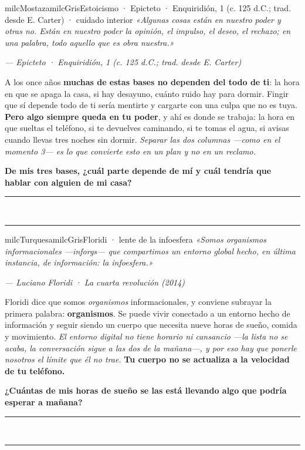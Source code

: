 \documentclass[11pt,letterpaper]{article}
\newcommand{\linead}[1]{\noindent\color{milcLinea}\rule{#1}{0.5pt}\color{milcNegro}}
\begin{document}
\begin{softbox}{milcMostaza}{milcGris}{Estoicismo · Epicteto · Enquiridión, 1 (c. 125 d.C.; trad. desde E. Carter) · cuidado interior}
\textit{«Algunas cosas están en nuestro poder y otras no. Están en nuestro poder la opinión, el impulso, el deseo, el rechazo; en una palabra, todo aquello que es obra nuestra.»}

{\footnotesize\itshape\color{milcNegro!70}--- Epicteto · Enquiridión, 1 (c. 125 d.C.; trad. desde E. Carter)}

A los once años \textbf{muchas de estas bases no dependen del todo de ti}: la hora en que se apaga la casa, si hay desayuno, cuánto ruido hay para dormir. Fingir que sí depende todo de ti sería mentirte y cargarte con una culpa que no es tuya. \textbf{Pero algo siempre queda en tu poder}, y ahí es donde se trabaja: la hora en que sueltas el teléfono, si te devuelves caminando, si te tomas el agua, si avisas cuando llevas tres noches sin dormir. \emph{Separar las dos columnas ---como en el momento 3--- es lo que convierte esto en un plan y no en un reclamo.}

\textbf{De mis tres bases, ¿cuál parte depende de mí y cuál tendría que hablar con alguien de mi casa?}
\end{softbox}
\linead{\linewidth}\\[1mm]
\linead{\linewidth}

\begin{softbox}{milcTurquesa}{milcGris}{Floridi · lente de la infoesfera}
\textit{«Somos organismos informacionales ---inforgs--- que compartimos un entorno global hecho, en última instancia, de información: la infoesfera.»}

{\footnotesize\itshape\color{milcNegro!70}--- Luciano Floridi · La cuarta revolución (2014)}

Floridi dice que somos \emph{organismos} informacionales, y conviene subrayar la primera palabra: \textbf{organismos}. Se puede vivir conectado a un entorno hecho de información y seguir siendo un cuerpo que necesita nueve horas de sueño, comida y movimiento. \emph{El entorno digital no tiene horario ni cansancio ---la lista no se acaba, la conversación sigue a las dos de la mañana---, y por eso hay que ponerle nosotros el límite que él no trae.} \textbf{Tu cuerpo no se actualiza a la velocidad de tu teléfono.}

\textbf{¿Cuántas de mis horas de sueño se las está llevando algo que podría esperar a mañana?}
\end{softbox}
\linead{\linewidth}\\[1mm]
\linead{\linewidth}
\end{document}

